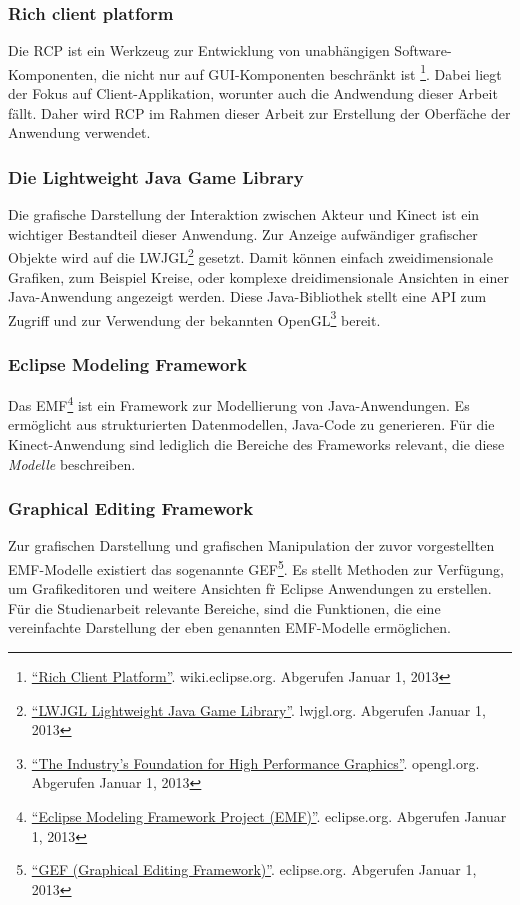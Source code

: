 \subsubsection{Rich client platform}
Die \gls{RCP} ist ein Werkzeug zur Entwicklung von unabh\"angigen Software-Komponenten, die nicht nur auf \acrshort{GUI}-Komponenten beschr\"ankt ist
\footnote{\href{http://wiki.eclipse.org/index.php/Rich_Client_Platform}{\enquote{Rich Client Platform}}. wiki.eclipse.org. Abgerufen Januar 1, 2013}.
Dabei liegt der Fokus auf Client-Applikation, worunter auch die Andwendung dieser Arbeit f\"allt.
Daher wird \acrshort{RCP} im Rahmen dieser Arbeit zur Erstellung der Oberf\"ache der Anwendung verwendet.
\subsubsection{Die Lightweight Java Game Library}
Die grafische Darstellung der Interaktion zwischen Akteur und Kinect ist ein wichtiger Bestandteil dieser Anwendung.
Zur Anzeige aufw\"andiger grafischer Objekte wird auf die \gls{LWJGL}\footnote{\href{http://www.lwjgl.org/}{\enquote{LWJGL Lightweight Java Game Library}}. lwjgl.org. Abgerufen Januar 1, 2013} gesetzt.
Damit k\"onnen einfach zweidimensionale Grafiken, zum Beispiel Kreise, oder komplexe dreidimensionale Ansichten in einer Java-Anwendung angezeigt werden.
Diese Java-Bibliothek stellt eine API zum Zugriff und zur Verwendung der bekannten \gls{OpenGL}\footnote{\href{https://www.opengl.org/}{\enquote{The Industry's Foundation for High Performance Graphics}}. opengl.org. Abgerufen Januar 1, 2013} bereit.

\subsubsection{Eclipse Modeling Framework}
Das \gls{EMF}\footnote{\href{http://www.eclipse.org/modeling/emf/}{\enquote{Eclipse Modeling Framework Project (EMF)}}. eclipse.org. Abgerufen Januar 1, 2013} ist ein Framework zur Modellierung von Java-Anwendungen.
Es erm\"oglicht aus strukturierten Datenmodellen, Java-Code zu generieren. F\"ur die Kinect-Anwendung sind lediglich die Bereiche des Frameworks relevant, die diese \textit{Modelle} beschreiben.
 
\subsubsection{Graphical Editing Framework}
Zur grafischen Darstellung und grafischen Manipulation der zuvor vorgestellten EMF-Modelle existiert das sogenannte \gls{GEF}\footnote{\href{http://www.eclipse.org/gef/}{\enquote{GEF (Graphical Editing Framework)}}. eclipse.org. Abgerufen Januar 1, 2013}.
Es stellt Methoden zur Verf\"ugung, um Grafikeditoren und weitere Ansichten f\"r Eclipse Anwendungen zu erstellen. F\"ur die Studienarbeit relevante Bereiche, sind die Funktionen, die eine vereinfachte Darstellung der eben genannten EMF-Modelle erm\"oglichen.

